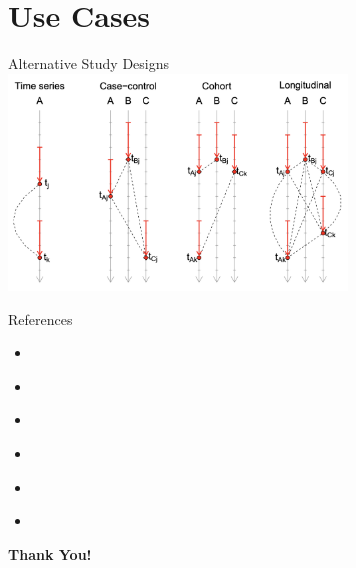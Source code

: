 \documentclass[english]{beamer}
\begin{document}
\section{Use Cases }
\begin{frame}{Alternative Study Designs}
    \centering
    \includegraphics[width=9cm,keepaspectratio]{images/use_cases.png}
\end{frame}
\begin{frame}{References}
    \begin{itemize}
        \item \cite{gasparrini_distributed_2010}
        \item \cite{gasparrini_distributed_2011}
        \item\cite{gareth_james__daniela_witten__trevor_hastie_introduction_nodate}
        \item \cite{gasparrini_attributable_2014}
        \item \cite{asenmacher_exposure-lag-response_2016}
        \item \cite{lowe_nonlinear_2018}
    \end{itemize}
    \vspace{1em} %
    \centering
    \textbf{\large Thank You!}
\end{frame}
\end{document}
